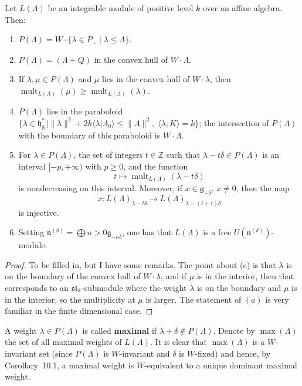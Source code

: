 \documentclass[12pt]{article}
\begin{document}
\begin{proposition}[12.5]
Let $L(\Lambda)$ be an integrable module of positive level $k$ over an affine algebra. Then:
\begin{enumerate}[label=\text{(\alph*)}]
\item $P(\Lambda) = W \cdot \{ \lambda \in P_+ \mid \lambda \le \Lambda \}$.
\item $P(\Lambda) = (\Lambda + Q)$ in the convex hull of $W \cdot \Lambda$.
\item If $\lambda, \mu \in P(\Lambda)$ and $\mu$ lies in the convex hull of $W \cdot \lambda$, then
$\operatorname{mult}_{L(\Lambda)}(\mu) \ge \operatorname{mult}_{L(\Lambda)}(\lambda)$.
\item $P(\Lambda)$ lies in the paraboloid
$\{ \lambda \in \mathfrak{h}^*_\mathbb{R} \mid \| \lambda \|^2 + 2k\langle \lambda | \Lambda_0 \rangle \le \| \Lambda \|^2, \; \langle \lambda, K \rangle = k \}$;
the intersection of $P(\Lambda)$ with the boundary of this paraboloid is $W \cdot \Lambda$.
\item For $\lambda \in P(\Lambda)$, the set of integers $t \in \mathbb{Z}$ such that $\lambda - t\delta \in P(\Lambda)$ is an interval $[-p, +\infty)$ with $p \ge 0$, and the function
\[
t \longmapsto \operatorname{mult}_{L(\Lambda)}(\lambda - t\delta)
\]
is nondecreasing on this interval. Moreover, if $x \in \mathfrak{g}_{-\delta}$, $x \neq 0$, then the map
\[x : L(\Lambda)_{\lambda - t\delta} \longrightarrow L(\Lambda)_{\lambda - (t+1)\delta}\]
is injective.
\item Setting $\mathfrak{n}^{(\delta)} = \bigoplus{n>0} \mathfrak{g}_{-n\delta}$, one has that $L(\Lambda)$ is a free $U(\mathfrak{n}^{(\delta)})$-module.
\end{enumerate}
\end{proposition}

\begin{proof}
To be filled in, but I have some remarks. The point about (c) is that $\lambda$ is on the boundary of the convex hull of $W\cdot\lambda$, and if $\mu$ is in the interior, then that corresponds to an $\sl_2$-submodule where the weight $\lambda$ is on the boundary and $\mu$ is in the interior, so the multiplicity at $\mu$ is larger. The statement of $(a)$ is very familiar in the finite dimensional case.
\end{proof}

A weight $\lambda \in P(\Lambda)$ is called \textbf{maximal} if $\lambda + \delta \notin P(\Lambda)$. Denote by $\operatorname{max}(\Lambda)$ the set of all maximal weights of $L(\Lambda)$. It is clear that $\operatorname{max}(\Lambda)$ is a $W$-invariant set (since $P(\Lambda)$ is $W$-invariant and $\delta$ is $W$-fixed) and hence, by Corollary~10.1, a maximal weight is $W$-equivalent to a unique dominant maximal weight.
\end{document}
